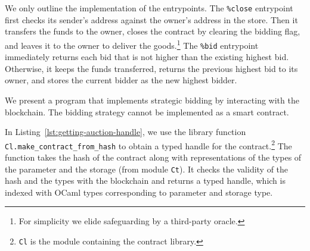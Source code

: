 \documentclass[runningheads]{llncs}
\begin{document}
We only outline the implementation of the entrypoints. The
\lstinline/%close/ entrypoint first checks its sender's address
against the owner's address in the store. Then it transfers the funds
to the owner, closes the contract by clearing the bidding flag, and
leaves it to the owner to deliver the
goods.\footnote{For simplicity we elide safeguarding by a third-party oracle.}
The \lstinline/%bid/ entrypoint immediately returns each bid that is not higher
than the existing highest bid. Otherwise, it keeps the funds
transferred, returns the previous highest bid to its owner, and stores
the current bidder as the new highest bidder.

We present a program that implements
strategic bidding by interacting with the
blockchain.  The bidding strategy cannot be implemented as a smart
contract.

In Listing~\ref{lst:getting-auction-handle}, we use the library function
\lstinline!Cl.make_contract_from_hash! to 
obtain a typed handle for the contract.\footnote{\lstinline!Cl! is the module containing the contract
  library.} The function
takes the hash of the contract along with representations of
the types of the parameter and the storage (from module
\lstinline!Ct!). It checks the validity of the hash and the types with
the blockchain and returns a typed
handle, which is indexed with OCaml types corresponding to parameter
and storage type.



\end{document}
